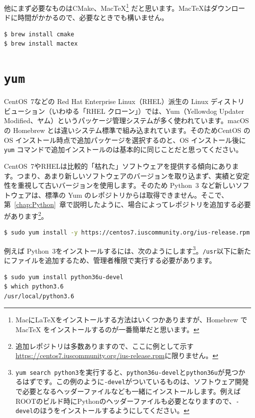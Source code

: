 他にまず必要なものはCMake、MacTeX\footnote{Macに\LaTeX をインストールする方法はいくつかありますが、Homebrew で MacTeX をインストールするのが一番簡単だと思います。} だと思います。MacTeXはダウンロードに時間がかかるので、必要なときでも構いません。
\begin{lstlisting}[language=bash]
$ brew install cmake
$ brew install mactex
\end{lstlisting}

\section{\texttt{yum}}

CentOS~7などの Red Hat Enterprise Linux（RHEL）派生の Linux ディストリビューション（いわゆる「RHEL クローン」）では、Yum（Yellowdog Updater Modified、ヤム）というパッケージ管理システムが多く使われています。macOS の Homebrew とは違いシステム標準で組み込まれています。そのためCentOS の OS インストール時点で追加パッケージを選択するのと、OS インストール後に \texttt{yum} コマンドで追加インストールのは基本的に同じことだと思ってください。

CentOS~7やRHELは比較的「枯れた」ソフトウェアを提供する傾向にあります。つまり、あまり新しいソフトウェアのバージョンを取り込まず、実績と安定性を重視して古いバージョンを使用します。そのため Python~3 など新しいソフトウェアは、標準の Yum のレポジトリからは取得できません。そこで、第~\ref{chap:Python}~章で説明したように、場合によってレポジトリを追加する必要があります\footnote{追加レポジトリは多数ありますので、ここに例として示す\url{https://centos7.iuscommunity.org/ius-release.rpm}に限りません。}。

\begin{lstlisting}[language=bash]
$ sudo yum install -y https://centos7.iuscommunity.org/ius-release.rpm
\end{lstlisting}

例えば Python~3をインストールするには、次のようにします\footnote{\texttt{yum search python3}を実行すると、\texttt{python36u-devel}と\texttt{python36u}が見つかるはずです。この例のように\texttt{-devel}がついているものは、ソフトウェア開発で必要となるヘッダーファイルなども一緒にインストールします。例えばROOTのビルド時にPythonのヘッダーファイルも必要となりますので、\texttt{-devel}のほうをインストールするようにしてください。}。\texttt{/usr}以下に新たにファイルを追加するため、管理者権限で実行する必要があります。

\begin{lstlisting}[language=bash]
$ sudo yum install python36u-devel
$ which python3.6
/usr/local/python3.6
\end{lstlisting}

